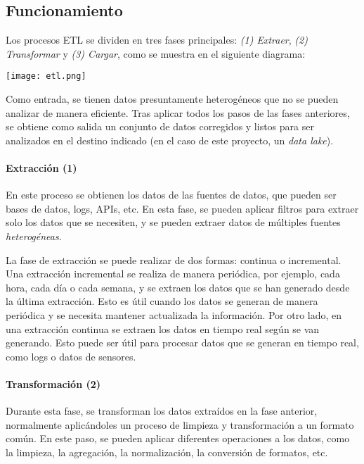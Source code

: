\subsection{Funcionamiento}
Los procesos ETL se dividen en tres fases principales: \textit{(1) Extraer},
\textit{(2) Transformar} y \textit{(3) Cargar}, como se muestra en el siguiente
diagrama:

\begin{minipage}{\linewidth}
	\centering
	\texttt{[image: etl.png]}
\end{minipage}

Como entrada, se tienen datos presuntamente heterogéneos que no se pueden
analizar de manera eficiente. Tras aplicar todos los pasos de las fases
anteriores, se obtiene como salida un conjunto de datos corregidos y listos para
ser analizados en el destino indicado (en el caso de este proyecto, un
\emph{data lake}). %

\paragraph{Extracción (1)}
En este proceso se obtienen los datos de las fuentes de datos, que pueden ser
bases de datos, logs, APIs, etc. En esta fase, se pueden aplicar filtros para
extraer solo los datos que se necesiten, y se pueden extraer datos de múltiples
fuentes \emph{heterogéneas}.

La fase de extracción se puede realizar de dos formas: continua o incremental.
Una extracción incremental se realiza de manera periódica, por ejemplo, cada
hora, cada día o cada semana, y se extraen los datos que se han generado desde
la última extracción. Esto es útil cuando los datos se generan de manera
periódica y se necesita mantener actualizada la información. Por otro lado, en
una extracción continua se extraen los datos en tiempo real según se van
generando. Esto puede ser útil para procesar datos que se generan en tiempo
real, como logs o datos de sensores.


\newpage{}
\paragraph{Transformación (2)}
Durante esta fase, se transforman los datos extraídos en la fase anterior,
normalmente aplicándoles un proceso de limpieza y transformación a un
formato común. En este paso, se pueden aplicar diferentes operaciones a los
datos, como la limpieza, la agregación, la normalización, la conversión de
formatos, etc.

